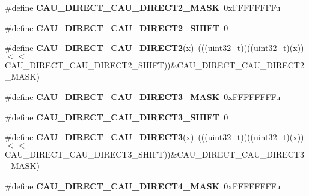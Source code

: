 \begin{DoxyCompactItemize}
\item 
\#define {\bfseries C\+A\+U\+\_\+\+D\+I\+R\+E\+C\+T\+\_\+\+C\+A\+U\+\_\+\+D\+I\+R\+E\+C\+T2\+\_\+\+M\+A\+SK}~0x\+F\+F\+F\+F\+F\+F\+F\+Fu\hypertarget{group__CAU__Register__Masks_ga1a2d18db12abd15f6bab404f4f36ed50}{}\label{group__CAU__Register__Masks_ga1a2d18db12abd15f6bab404f4f36ed50}

\item 
\#define {\bfseries C\+A\+U\+\_\+\+D\+I\+R\+E\+C\+T\+\_\+\+C\+A\+U\+\_\+\+D\+I\+R\+E\+C\+T2\+\_\+\+S\+H\+I\+FT}~0\hypertarget{group__CAU__Register__Masks_ga84f35cfb3852d2a827fa1ad80bfb207f}{}\label{group__CAU__Register__Masks_ga84f35cfb3852d2a827fa1ad80bfb207f}

\item 
\#define {\bfseries C\+A\+U\+\_\+\+D\+I\+R\+E\+C\+T\+\_\+\+C\+A\+U\+\_\+\+D\+I\+R\+E\+C\+T2}(x)~(((uint32\+\_\+t)(((uint32\+\_\+t)(x))$<$$<$C\+A\+U\+\_\+\+D\+I\+R\+E\+C\+T\+\_\+\+C\+A\+U\+\_\+\+D\+I\+R\+E\+C\+T2\+\_\+\+S\+H\+I\+FT))\&C\+A\+U\+\_\+\+D\+I\+R\+E\+C\+T\+\_\+\+C\+A\+U\+\_\+\+D\+I\+R\+E\+C\+T2\+\_\+\+M\+A\+SK)\hypertarget{group__CAU__Register__Masks_gaa84f31257ab678ef4963956c651a5d0d}{}\label{group__CAU__Register__Masks_gaa84f31257ab678ef4963956c651a5d0d}

\item 
\#define {\bfseries C\+A\+U\+\_\+\+D\+I\+R\+E\+C\+T\+\_\+\+C\+A\+U\+\_\+\+D\+I\+R\+E\+C\+T3\+\_\+\+M\+A\+SK}~0x\+F\+F\+F\+F\+F\+F\+F\+Fu\hypertarget{group__CAU__Register__Masks_ga510182cd7a5c184e092fae143ab6b4cd}{}\label{group__CAU__Register__Masks_ga510182cd7a5c184e092fae143ab6b4cd}

\item 
\#define {\bfseries C\+A\+U\+\_\+\+D\+I\+R\+E\+C\+T\+\_\+\+C\+A\+U\+\_\+\+D\+I\+R\+E\+C\+T3\+\_\+\+S\+H\+I\+FT}~0\hypertarget{group__CAU__Register__Masks_ga0a9ed1b0b2d909b4c11c6591d4c8425c}{}\label{group__CAU__Register__Masks_ga0a9ed1b0b2d909b4c11c6591d4c8425c}

\item 
\#define {\bfseries C\+A\+U\+\_\+\+D\+I\+R\+E\+C\+T\+\_\+\+C\+A\+U\+\_\+\+D\+I\+R\+E\+C\+T3}(x)~(((uint32\+\_\+t)(((uint32\+\_\+t)(x))$<$$<$C\+A\+U\+\_\+\+D\+I\+R\+E\+C\+T\+\_\+\+C\+A\+U\+\_\+\+D\+I\+R\+E\+C\+T3\+\_\+\+S\+H\+I\+FT))\&C\+A\+U\+\_\+\+D\+I\+R\+E\+C\+T\+\_\+\+C\+A\+U\+\_\+\+D\+I\+R\+E\+C\+T3\+\_\+\+M\+A\+SK)\hypertarget{group__CAU__Register__Masks_gabcf7cce02f44a12d83b0b796ce992859}{}\label{group__CAU__Register__Masks_gabcf7cce02f44a12d83b0b796ce992859}

\item 
\#define {\bfseries C\+A\+U\+\_\+\+D\+I\+R\+E\+C\+T\+\_\+\+C\+A\+U\+\_\+\+D\+I\+R\+E\+C\+T4\+\_\+\+M\+A\+SK}~0x\+F\+F\+F\+F\+F\+F\+F\+Fu\hypertarget{group__CAU__Register__Masks_gae8d866b4ec3bf7cad4a7983517e615b7}{}\label{group__CAU__Register__Masks_gae8d866b4ec3bf7cad4a7983517e615b7}


\end{DoxyCompactItemize}
